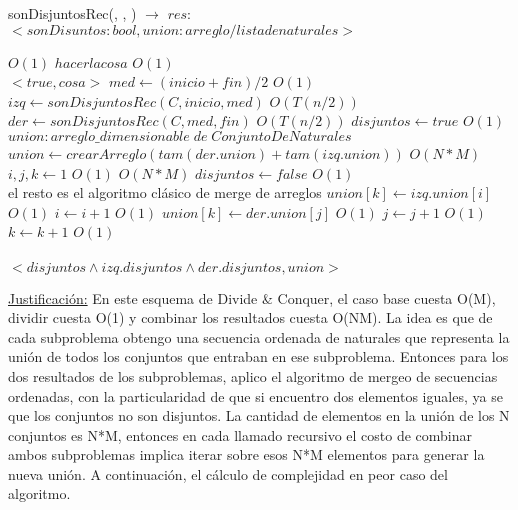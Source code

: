 \documentclass[10pt, a4paper]{article}
\begin{document}
\begin{algorithm}[H]{sonDisjuntosRec(, , ) $\to$ $res$: $<sonDisuntos: bool, union: arreglo/lista de naturales>$}	
	\begin{algorithmic}[1]
							\Comment $O(1)$
			\State $hacer la cosa$			\Comment $O(1)$\\
			\Return $<true, cosa>$
		\Else
			\State $med \gets (inicio + fin)/2$	\Comment $O(1)$
			\State $izq \gets sonDisjuntosRec(C, inicio, med)$	\Comment $O(T(n/2))$
			\State $der \gets sonDisjuntosRec(C, med, fin)$	\Comment $O(T(n/2))$
			\State $disjuntos \gets true$	\Comment $O(1)$
			\State $union: arreglo\_dimensionable\; de\; ConjuntoDeNaturales$
			\State $union \gets crearArreglo(tam(der.union) + tam(izq.union))$	\Comment $O(N*M)$
			\State $i, j, k \gets 1$	\Comment $O(1)$
						\Comment $O(N*M)$
				\State $disjuntos \gets false$	\Comment $O(1)$
				\EndIf \\
				\Comment el resto es el algoritmo clásico de merge de arreglos
					\State $union[k] \gets izq.union[i]$	\Comment $O(1)$
					\State $i \gets i+1$	\Comment $O(1)$
				\Else
					\State $union[k] \gets der.union[j]$	\Comment $O(1)$
					\State $j \gets j+1$	\Comment $O(1)$
				\EndIf
			 	\State $k\gets k+1$			\Comment $O(1)$		 	
			\EndWhile \\
			
		\EndIf	\\
		\Return $<disjuntos \wedge izq.disjuntos \wedge der.disjuntos, union>$
	
		\medskip
		\Statex \underline{Justificación:} En este esquema de Divide \& Conquer, el caso base cuesta O(M), dividir cuesta O(1) y combinar los resultados cuesta O(NM). La idea es que de cada subproblema obtengo una secuencia ordenada de naturales que representa la unión de todos los conjuntos que entraban en ese subproblema. Entonces para los dos resultados de los subproblemas, aplico el algoritmo de mergeo de secuencias ordenadas, con la particularidad de que si encuentro dos elementos iguales, ya se que los conjuntos no son disjuntos. La cantidad de elementos en la unión de los N conjuntos es N*M, entonces en cada llamado recursivo el costo de combinar ambos subproblemas implica iterar sobre esos N*M elementos para generar la nueva unión. A continuación, el cálculo de complejidad en peor caso del algoritmo.
    \end{algorithmic}
\end{algorithm}	
\end{document}
